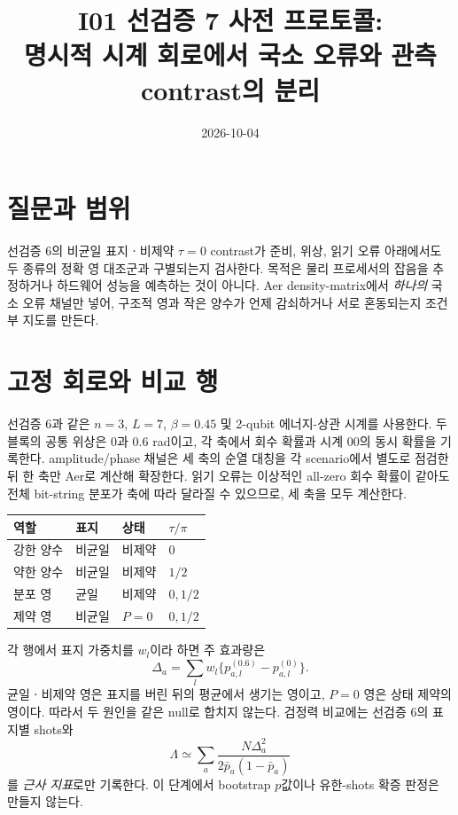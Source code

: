 \documentclass[11pt]{article}
\begin{document}
\title{I01 선검증 7 사전 프로토콜:\\
명시적 시계 회로에서 국소 오류와 관측 contrast의 분리}
\date{2026-10-04}
\maketitle

\section*{질문과 범위}
선검증 6의 비균일 표지ㆍ비제약 $\tau=0$ contrast가 준비, 위상, 읽기 오류 아래에서도
두 종류의 정확 영 대조군과 구별되는지 검사한다. 목적은 물리 프로세서의 잡음을
추정하거나 하드웨어 성능을 예측하는 것이 아니다. Aer density-matrix에서 \emph{하나의}
국소 오류 채널만 넣어, 구조적 영과 작은 양수가 언제 감쇠하거나 서로 혼동되는지
조건부 지도를 만든다.

\section*{고정 회로와 비교 행}
선검증 6과 같은 $n=3$, $L=7$, $\beta=0.45$ 및 2-qubit 에너지-상관 시계를 사용한다.
두 블록의 공통 위상은 $0$과 $0.6$ rad이고, 각 축에서 회수 확률과 시계 $00$의
동시 확률을 기록한다. amplitude/phase 채널은 세 축의 순열 대칭을 각 scenario에서
별도로 점검한 뒤 한 축만 Aer로 계산해 확장한다. 읽기 오류는 이상적인 all-zero 회수
확률이 같아도 전체 bit-string 분포가 축에 따라 달라질 수 있으므로, 세 축을 모두 계산한다.

\begin{center}
\begin{tabular}{llll}
\toprule
역할 & 표지 & 상태 & $\tau/\pi$\\
\midrule
강한 양수 & 비균일 & 비제약 & $0$\\
약한 양수 & 비균일 & 비제약 & $1/2$\\
분포 영 & 균일 & 비제약 & $0,1/2$\\
제약 영 & 비균일 & $P=0$ & $0,1/2$\\
\bottomrule
\end{tabular}
\end{center}

각 행에서 표지 가중치를 $w_l$이라 하면 주 효과량은
\[
 \Delta_a=\sum_lw_l\{p_{a,l}^{(0.6)}-p_{a,l}^{(0)}\}.
\]
균일ㆍ비제약 영은 표지를 버린 뒤의 평균에서 생기는 영이고, $P=0$ 영은
상태 제약의 영이다. 따라서 두 원인을 같은 null로 합치지 않는다.
검정력 비교에는 선검증 6의 표지별 shots와
\[
 \Lambda\simeq\sum_a\frac{N\Delta_a^2}{2\bar p_a(1-\bar p_a)}
\]
를 \emph{근사 지표}로만 기록한다. 이 단계에서 bootstrap $p$값이나 유한-shots
확증 판정은 만들지 않는다.
\end{document}
